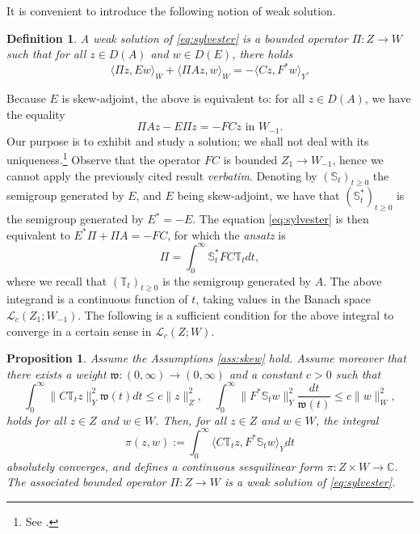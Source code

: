 \documentclass[10pt]{article}
\newtheorem{Proposition}[Theorem]{Proposition}
\newtheorem{Definition}[Theorem]{Definition}
\begin{document}
It is convenient to introduce the following notion of weak solution.
\begin{Definition}
A weak solution of \eqref{eq:sylvester} is a bounded operator $\Pi : Z \rightarrow W$ such that for all $z \in D(A)$ and $w \in D(E)$, there holds
\[
\langle \Pi z , Ew \rangle_W + \langle \Pi A z,w \rangle_W = - \langle Cz,F^*w\rangle_Y.
\]
\end{Definition}
Because $E$ is skew-adjoint, the above is equivalent to: for all $z \in D(A)$, we have the equality 
\[
\Pi A z-E\Pi z  = -FCz \mbox{ in } W_{-1}.
\]
Our purpose is to exhibit and study a solution; we shall not deal with its uniqueness.\footnote{See \cite[\S 3.3, Proposition 1]{emirsajlow}.} Observe that the operator $FC$ is bounded $Z_1 \rightarrow W_{-1}$, hence we cannot apply the previously cited result \textit{verbatim}.  Denoting by $(\mathbb{S}_t)_{t \geq 0}$ the semigroup generated by $E$, and $E$ being skew-adjoint, we have that $(\mathbb{S}_t^*)_{t \geq 0}$ is the semigroup generated by $E^* = -E$. The equation \eqref{eq:sylvester} is then equivalent to $E^* \Pi + \Pi A = -FC$, for which the \textit{ansatz} is
\begin{equation}\label{eq:ansatz}
    \Pi = \int_0^\infty \mathbb{S}_t^* FC \mathbb{T}_t dt,
\end{equation}
where we recall that $(\mathbb{T}_t)_{t \geq 0}$ is the semigroup generated by $A$. The above integrand is a continuous function of $t$, taking values in the Banach space $\mathcal{L}_c(Z_1;W_{-1})$. The following is a sufficient condition for the above integral to converge in a certain sense in $\mathcal{L}_c(Z;W)$.
\begin{Proposition}\label{prop:sylv} Assume the Assumptions \ref{ass:skew} hold. Assume moreover that there exists a weight $\mathfrak{w} : (0,\infty) \rightarrow (0,\infty)$ and a constant $c > 0$ such that 
\begin{equation}\label{eq:cond_convergence}
    \int_0^\infty \| C\mathbb T_t z \|_Y^2 \mathfrak{w}(t) dt \leq c \| z \|_Z^2,\quad \int_0^\infty \| F^* \mathbb S_t w \|_Y^2 \frac{dt}{\mathfrak{w}(t)} \leq c \| w \|_W^2,
\end{equation}
holds for all $z \in Z$ and $w \in W$. Then, for all $z \in Z$ and $w \in W$, the integral 
\[
\pi(z,w) := \int_0^\infty \langle C\mathbb T_t z,F^* \mathbb S_t w\rangle_Y d t
\]
absolutely converges, and defines a continuous sesquilinear form $\pi : Z \times W \rightarrow \mathbb{C}$. The associated bounded operator $\Pi : Z \rightarrow W$ is a weak solution of \eqref{eq:sylvester}.
\end{Proposition}
\end{document}
